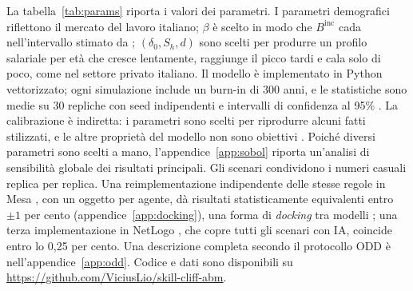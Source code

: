 \documentclass[preprint,12pt,authoryear]{elsarticle}
\begin{document}
La tabella~\ref{tab:params} riporta i valori dei parametri. I parametri demografici riflettono il mercato del lavoro italiano; $\beta$ è scelto in modo che $B^{\mathrm{inc}}$ cada nell'intervallo stimato da \citet{Jarosch2021}; $(\delta_0,S_h,d)$ sono scelti per produrre un profilo salariale per età che cresce lentamente, raggiunge il picco tardi e cala solo di poco, come nel settore privato italiano. Il modello è implementato in Python vettorizzato; ogni simulazione include un burn-in di 300 anni, e le statistiche sono medie su 30 repliche con seed indipendenti e intervalli di confidenza al 95\% \citep[sul numero di repliche si veda][]{Lee2015}. La calibrazione è indiretta: i parametri sono scelti per riprodurre alcuni fatti stilizzati, e le altre proprietà del modello non sono obiettivi \citep{Windrum2007,Fagiolo2007}. Poiché diversi parametri sono scelti a mano, l'appendice~\ref{app:sobol} riporta un'analisi di sensibilità globale dei risultati principali. Gli scenari condividono i numeri casuali replica per replica. Una reimplementazione indipendente delle stesse regole in Mesa \citep{Kazil2020}, con un oggetto per agente, dà risultati statisticamente equivalenti entro $\pm1$ per cento (appendice~\ref{app:docking}), una forma di \emph{docking} tra modelli \citep{Axtell1996}; una terza implementazione in NetLogo \citep{Wilensky1999}, che copre tutti gli scenari con IA, coincide entro lo 0,25 per cento. Una descrizione completa secondo il protocollo ODD è nell'appendice~\ref{app:odd}. Codice e dati sono disponibili su \url{https://github.com/ViciusLio/skill-cliff-abm}.
\end{document}
